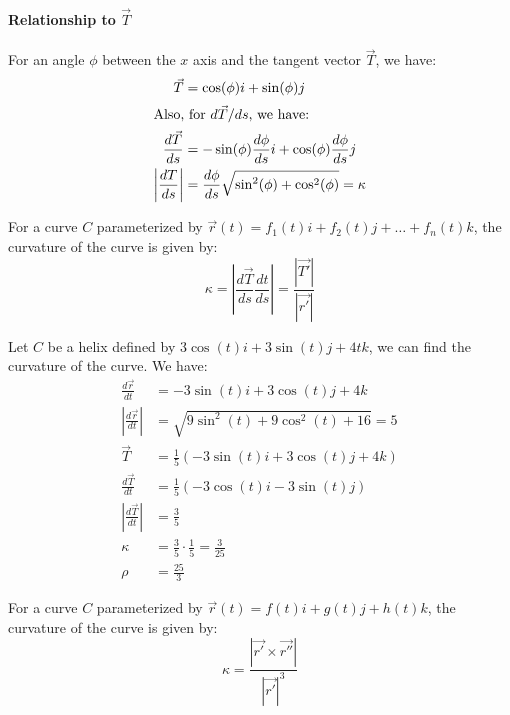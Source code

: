 \documentclass[11pt]{report}
\begin{document}
\paragraph{Relationship to $\vec{T}$} For an angle $\phi$ between the $x$ axis and the tangent vector $\vec{T}$, we have:
\begin{align}
    \vec{T} &= \cos(\phi)i + \sin(\phi)j \\
    \intertext{Also, for $d\vec{T}/ds$, we have:}
    \frac{d\vec{T}}{ds} &= -\sin(\phi)\frac{d\phi}{ds}i + \cos(\phi)\frac{d\phi}{ds}j \nonumber \\
    \left|\frac{d T}{ds}\right| &= \frac{d\phi }{ds} \sqrt{\sin^2 (\phi) + \cos^2 (\phi)} = \kappa \\
\end{align}
\begin{definition}
    For a curve $C$ parameterized by $\vec{r}(t) = f_1(t)i + f_2(t)j + \ldots + f_n(t)k$, the curvature of the curve is given by:
    \begin{equation}
        \kappa = \left| \frac{d\vec{T}}{ds} \frac{dt}{ds} \right| = \frac{|\vec{T'}|}{|\vec{r'}|} 
    \end{equation}
\end{definition}
\begin{example}[Helix]
    Let $C$ be a helix defined by $3\cos(t)i + 3\sin(t)j + 4tk$, we can find the curvature of the curve. We have:
    \begin{align*}
        \frac{d\vec{r}}{dt} &= -3\sin(t)i + 3\cos(t)j + 4k \\
        |\frac{d\vec{r}}{dt}| &= \sqrt{9\sin^2(t) + 9\cos^2(t) + 16} = 5 \\
        \vec{T} &= \frac{1}{5}(-3\sin(t)i + 3\cos(t)j + 4k) \\
        \frac{d\vec{T}}{dt} &= \frac{1}{5}(-3\cos(t)i - 3\sin(t)j) \\
        |\frac{d\vec{T}}{dt}| &= \frac{3}{5} \\
        \kappa &= \frac{3}{5} \cdot \frac{1}{5} = \frac{3}{25} \\
        \rho &= \frac{25}{3}
    \end{align*}
\end{example}
\begin{definition}
    For a curve $C$ parameterized by $\vec{r}(t) = f(t)i + g(t)j + h(t)k$, the curvature of the curve is given by:
    \begin{equation}
        \kappa = \frac{|\vec{r'} \times \vec{r''}|}{|\vec{r'}|^3}
    \end{equation}
\end{definition}
\end{document}
